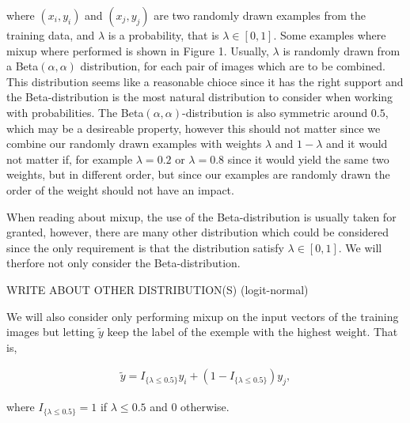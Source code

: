 \documentclass{article}
\begin{document}
where $(x_i, y_i)$ and $(x_j, y_j)$ are two randomly drawn examples from the training data, and $\lambda$ 
is a probability, that is $\lambda \in [0,1]$. Some examples where mixup where performed is shown in Figure 1.  Usually, $\lambda$ is randomly drawn from a Beta$(\alpha, \alpha)$ 
distribution, for each pair of images which are to be combined. This distribution seems like a 
reasonable chioce since it has the right support and the Beta-distribution is the most natural distribution to
consider when working with probabilities. The Beta$(\alpha, \alpha)$-distribution is also symmetric around $0.5$, which may be 
a desireable property, however this should not matter since we combine our randomly drawn examples with weights $\lambda$ and $1-\lambda$ and 
it would not matter if, for example $\lambda = 0.2$ or $\lambda = 0.8$ since it would yield the same two weights, but in different order, but 
since our examples are randomly drawn the order of the weight should not have an impact. 

When reading about mixup, the use of the Beta-distribution is usually taken for granted, however, there are many other distribution which 
could be considered since the only requirement is that the distribution satisfy $\lambda \in [0,1]$. We will therfore not only consider the 
Beta-distribution. 

WRITE ABOUT OTHER DISTRIBUTION(S) (logit-normal)

We will also consider only performing mixup on the input vectors of the training images but letting $\tilde{y}$ keep the label of the exemple 
with the highest weight. That is,

\begin{align*}
\tilde{y} = I_{\{ \lambda \leq 0.5 \}} y_i + (1-I_{\{ \lambda \leq 0.5 \}}) y_j, 
\end{align*}

where $I_{\{ \lambda \leq 0.5 \}} = 1$ if $\lambda \leq 0.5$ and $0$ otherwise.
\end{document}

